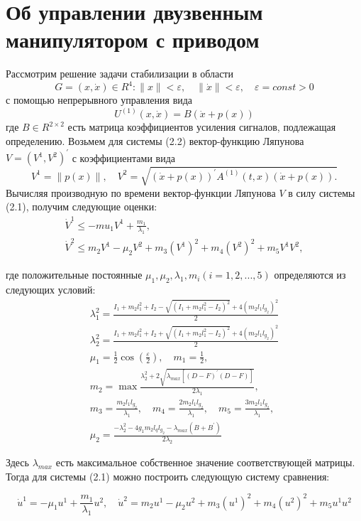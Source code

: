 \section{Об управлении двузвенным манипулятором с приводом} \label{p23}

Рассмотрим решение задачи стабилизации в области 
$$G = {(x, \dot x) \in R^4 : \|x\|<\varepsilon, \quad \|\dot x\|<\varepsilon, \quad \varepsilon=const>0}$$
с помощью непрерывного управления вида
$$U^{(1)}(x, \dot x) = B(\dot x + p(x))$$ \label{2.3'}     
где $B \in R^{2 \times 2}$ есть матрица коэффициентов усиления сигналов, подлежащая определению.
Возьмем для системы (2.2) вектор-функцию Ляпунова $V = (V^1, V^2)^{'}$  с коэффициентами вида $$V^1 = \|p(x)\|, \quad V^2 = \sqrt{(\dot x + p(x))^{'} A^{(1)}(t, x)(\dot x + p(x)).}$$
Вычисляя производную по времени вектор-функции Ляпунова $V$ в силу системы (2.1), получим следующие оценки:
$$
\begin{array}{l}
\dot V^1 \le -mu_1 V^1 + \frac{m_1}{\lambda_1},\\
\dot V^2 \le m_2 V^1 - \mu_2 V^2 + m_3 (V^1)^2 + m_4 (V^2)^2 + m_5 V^1 V^2, 
\end{array}
$$

где положительные постоянные $\mu_1, \mu_2, \lambda_1, m_i (i=1,2,...,5)$ определяются из следующих условий:
$$
\begin{array}{l}
\displaystyle \lambda_1^2 = \frac{I_1 + m_2 l_1^2 + I_2 - \sqrt{(I_1 + m_2 l_1^2 - I_2)^2} + 4(m_2 l_1 l_{g_2})^2}{2}\\
\displaystyle \lambda_2^2 = \frac{I_1 + m_2 l_1^2 + I_2 + \sqrt{(I_1 + m_2 l_1^2 - I_2)^2} + 4(m_2 l_1 l_{g_2})^2}{2}\\
\displaystyle \mu_1 =\frac12 \cos(\frac{\varepsilon}{2}), \quad m_1 = \frac12,\\
\displaystyle m_2 = \max \frac{\lambda_2^2 + 2 \sqrt{\lambda_{max} [(D-F)^{'} (D-F)]}}{2 \lambda_1},\\
\displaystyle m_3 = \frac{m_2 l_1 l_{g_2}}{\lambda_1}, \quad m_4 = \frac{2 m_2 l_1 l_{g_2}}{\lambda_1}, \quad m_5 = \frac{3 m_2 l_1 l_{g_2}}{\lambda_1},\\
\displaystyle \mu_2 = \frac{-\lambda_2^2 - 4 g_1 m_2 l_q l_{g_2} - \lambda_{max} (B + B^{'})}{2 \lambda_2}
\end{array}
$$

Здесь $\lambda_{max}$ есть максимальное собственное значение соответствующей матрицы. 
Тогда для системы (2.1) можно построить следующую систему сравнения:

\begin{equation}\label{2.4'}
\dot u^1 = - \mu_1 u^1 + \frac{m_1}{\lambda_1} u^2, \quad \dot u^2 = m_2 u^1 - \mu_2 u^2 + m_3 (u^1)^2 + m_4(u^2)^2 + m_5 u^1 u^2
\end{equation}

